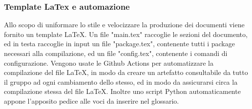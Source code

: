 	    \subsubsection{Template LaTex e automazione}
	    Allo scopo di uniformare lo stile e velocizzare la produzione dei documenti viene fornito un template LaTeX.
	    Un file "main.tex" raccoglie le sezioni del documento, ed in testa raccoglie in input un file "package.tex", contenente tutti i package necessari alla compilazione, ed un file "config.tex", contenente i comandi di configurazione.
	    Vengono usate le Github Actions per automatizzare la compilazione del file LaTeX, in modo da creare un artefatto consultabile da tutto il gruppo ad ogni cambiamento dello stesso, ed in modo  da assicurarsi circa la compilazione stessa del file LaTeX. Inoltre uno script Python automaticamente appone l'apposito pedice alle voci da inserire nel glossario.

